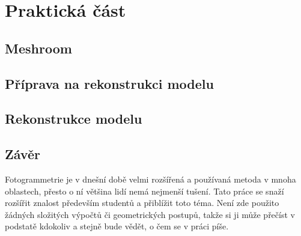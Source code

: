 \documentclass[12pt]{report}			%
\begin{document}
	\part{Praktická část}
        \chapter{Meshroom}
        \chapter{Příprava na rekonstrukci modelu}
        \chapter{Rekonstrukce modelu}


	\appendix
	
	\chapter*{Závěr}
	
        Fotogrammetrie je v dnešní době velmi rozšířená a používaná metoda v mnoha oblastech, přesto o ní většina lidí nemá nejmenší tušení. Tato práce se snaží rozšířit znalost především studentů a přiblížit toto téma. Není zde použito žádných složitých výpočtů či geometrických postupů, takže si ji může přečíst v podstatě kdokoliv a stejně bude vědět, o čem se v práci píše.
	
	\nocite{*}
    \printbibliography					%
    \printglossary[title={Zkratky}]		%
    \listoffigures						%
    \listoftables						%
    
    \begin{prilohy}
    \end{prilohy}
\end{document}
